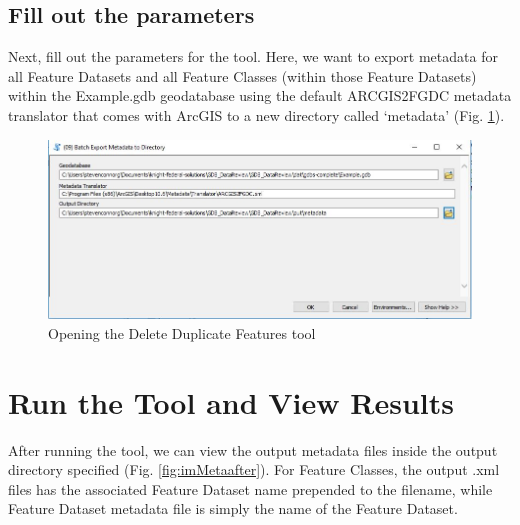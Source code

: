 \documentclass[openany]{book}
\theoremstyle{definition}
\theoremstyle{definition}
\theoremstyle{definition}
\theoremstyle{remark}
\begin{document}
\subsection{Fill out the parameters}\label{fill-out-the-parameters-10}

Next, fill out the parameters for the tool. Here, we want to export
metadata for all Feature Datasets and all Feature Classes (within those
Feature Datasets) within the Example.gdb geodatabase using the default
ARCGIS2FGDC metadata translator that comes with ArcGIS to a new
directory called `metadata' (Fig. \ref{fig:imMetaparams}).

\begin{figure}[H]

{\centering \includegraphics{figures/exMeta-params} 

}

\caption{Opening the Delete Duplicate Features tool}\label{fig:imMetaparams}
\end{figure}

\section{Run the Tool and View
Results}\label{run-the-tool-and-view-results-10}

After running the tool, we can view the output metadata files inside the
output directory specified (Fig. \ref{fig:imMetaafter}). For Feature
Classes, the output .xml files has the associated Feature Dataset name
prepended to the filename, while Feature Dataset metadata file is simply
the name of the Feature Dataset.
\end{document}
